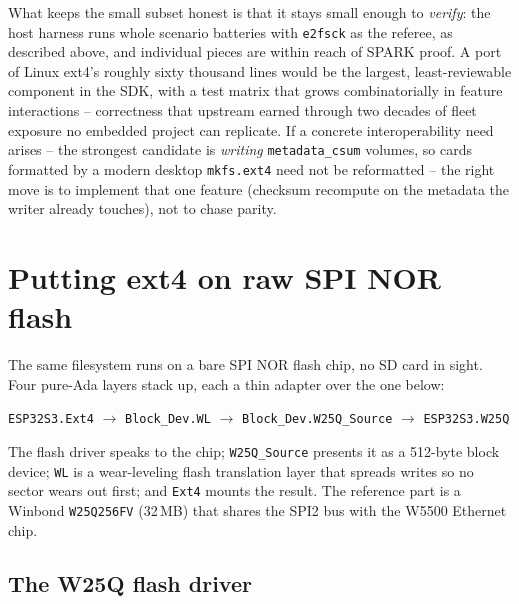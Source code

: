What keeps the small subset honest is that it stays small enough to
\emph{verify}: the host harness runs whole scenario batteries with
\texttt{e2fsck} as the referee, as described above, and individual pieces are
within reach of SPARK proof. A port of Linux ext4's roughly sixty thousand lines
would be the largest, least-reviewable component in the SDK, with a test
matrix that grows combinatorially in feature interactions -- correctness that
upstream earned through two decades of fleet exposure no embedded project can
replicate. If a concrete interoperability need arises -- the strongest
candidate is \emph{writing} \texttt{metadata\_csum} volumes, so cards formatted
by a modern desktop \texttt{mkfs.ext4} need not be reformatted -- the right
move is to implement that one feature (checksum recompute on the metadata the
writer already touches), not to chase parity.

\section{Putting ext4 on raw SPI NOR flash}

The same filesystem runs on a bare SPI NOR flash chip, no SD card in sight. Four
pure-Ada layers stack up, each a thin adapter over the one below:

\begin{center}
\texttt{ESP32S3.Ext4} $\rightarrow$ \texttt{Block\_Dev.WL} $\rightarrow$
\texttt{Block\_Dev.W25Q\_Source} $\rightarrow$ \texttt{ESP32S3.W25Q}
\end{center}

\noindent The flash driver speaks to the chip; \texttt{W25Q\_Source} presents it
as a 512-byte block device; \texttt{WL} is a wear-leveling flash translation
layer that spreads writes so no sector wears out first; and \texttt{Ext4} mounts
the result. The reference part is a Winbond \texttt{W25Q256FV} (32\,MB) that shares
the SPI2 bus with the W5500 Ethernet chip.

\subsection{The W25Q flash driver}

